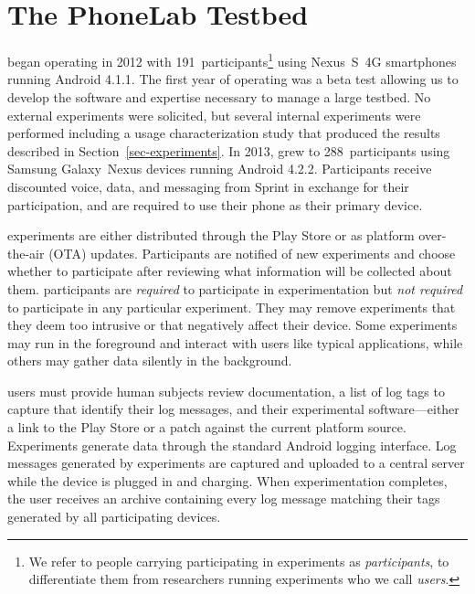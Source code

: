 \section{The PhoneLab Testbed}
\label{sec-testbed}

\PhoneLab{} began operating in 2012 with 191~participants\footnote{\small We
refer to people carrying participating in \PhoneLab{} experiments as
\PhoneLab{} \textit{participants}, to differentiate them from researchers
running \PhoneLab{} experiments who we call \textit{users}.} using Nexus~S~4G
smartphones running Android 4.1.1. The first
year of operating was a beta test allowing us to develop the software and
expertise necessary to manage a large testbed. No external experiments were
solicited, but several internal experiments were performed including a usage
characterization study that produced the results described in
Section~\ref{sec-experiments}. In 2013, \PhoneLab{} grew to 288~participants
using Samsung Galaxy~Nexus devices running Android 4.2.2. Participants receive
discounted voice, data, and messaging from Sprint in exchange for their
participation, and are required to use their \PhoneLab{} phone as their primary
device.

\PhoneLab{} experiments are either distributed through the Play Store or as
platform over-the-air (OTA) updates. Participants are notified of new
experiments and choose whether to participate after reviewing what
information will be collected about them. \PhoneLab{} participants are
\textit{required} to participate in experimentation but \textit{not required}
to participate in any particular experiment. They may remove experiments that
they deem too intrusive or that negatively affect their device. Some
experiments may run in the foreground and interact with users like typical
applications, while others may gather data silently in the background.

\PhoneLab{} users must provide human subjects review documentation, a list of
log tags to capture that identify their log messages, and their experimental
software---either a link to the Play Store or a patch against the current
\PhoneLab{} platform source. Experiments generate data through the standard
Android logging interface. Log messages generated by \PhoneLab{} experiments are
captured and uploaded to a central server while the device is plugged in and
charging. When experimentation completes, the user receives an archive
containing every log message matching their tags generated by all participating
devices.

